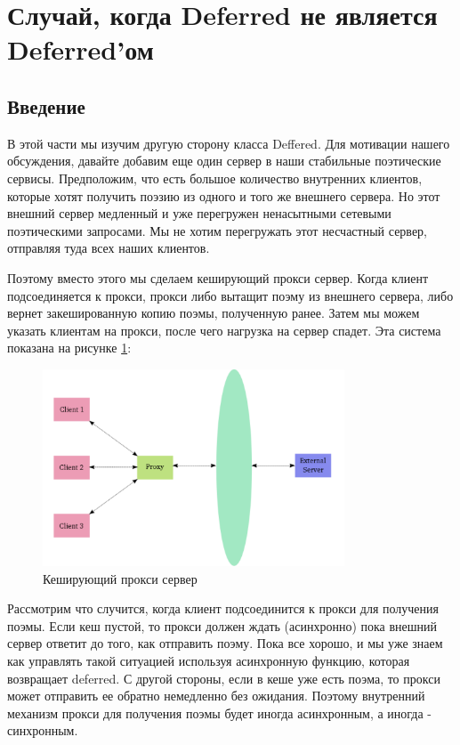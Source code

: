 

\section{Случай, когда Deferred не является Deferred'ом\label{sec:part14}}

\subsection{Введение}


В этой части мы изучим другую сторону класса Deffered. 
Для мотивации нашего обсуждения, давайте добавим еще один сервер в наши 
стабильные поэтические сервисы. Предположим, что есть большое 
количество внутренних клиентов, которые хотят получить поэзию из 
одного и того же внешнего сервера. Но этот внешний сервер медленный 
и уже перегружен ненасытными сетевыми поэтическими запросами. Мы не 
хотим перегружать этот несчастный сервер, отправляя туда всех наших клиентов.  


Поэтому вместо этого мы сделаем кеширующий прокси сервер. Когда 
клиент подсоединяется к прокси, прокси либо вытащит поэму из 
внешнего сервера, либо вернет закешированную копию 
поэмы, полученную ранее. Затем мы можем указать клиентам на прокси, 
после чего нагрузка на сервер спадет. Эта система 
показана на рисунке \ref{fig:proxy1}:

\begin{figure}[h]
\begin{center}
\includegraphics[width=0.8\textwidth]{images/proxy1.pdf} 
\caption{Кеширующий прокси сервер}\label{fig:proxy1}
\end{center}
\end{figure}

Рассмотрим что случится, когда клиент подсоединится к 
прокси для получения поэмы. Если кеш пустой, то прокси должен 
ждать (асинхронно) пока внешний сервер ответит до того, как 
отправить поэму. Пока все хорошо, и мы уже знаем как управлять 
такой ситуацией используя асинхронную функцию, которая 
возвращает deferred. С другой стороны, если в кеше уже есть поэма, 
то прокси может отправить ее обратно немедленно без ожидания. 
Поэтому внутренний механизм прокси для получения поэмы 
будет иногда асинхронным, а иногда - синхронным.


